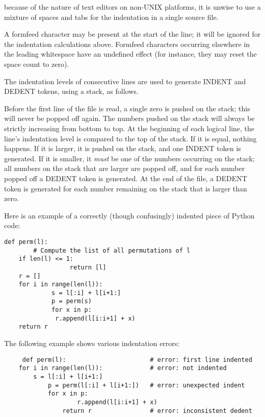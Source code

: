  because of the nature of
text editors on non-UNIX platforms, it is unwise to use a mixture of
spaces and tabs for the indentation in a single source file.

A formfeed character may be present at the start of the line; it will
be ignored for the indentation calculations above.  Formfeed
characters occurring elsewhere in the leading whitespace have an
undefined effect (for instance, they may reset the space count to
zero).

The indentation levels of consecutive lines are used to generate
INDENT and DEDENT tokens, using a stack, as follows.

Before the first line of the file is read, a single zero is pushed on
the stack; this will never be popped off again.  The numbers pushed on
the stack will always be strictly increasing from bottom to top.  At
the beginning of each logical line, the line's indentation level is
compared to the top of the stack.  If it is equal, nothing happens.
If it is larger, it is pushed on the stack, and one INDENT token is
generated.  If it is smaller, it \emph{must} be one of the numbers
occurring on the stack; all numbers on the stack that are larger are
popped off, and for each number popped off a DEDENT token is
generated.  At the end of the file, a DEDENT token is generated for
each number remaining on the stack that is larger than zero.

Here is an example of a correctly (though confusingly) indented piece
of Python code:

\begin{verbatim}
def perm(l):
        # Compute the list of all permutations of l
    if len(l) <= 1:
                  return [l]
    r = []
    for i in range(len(l)):
             s = l[:i] + l[i+1:]
             p = perm(s)
             for x in p:
              r.append(l[i:i+1] + x)
    return r
\end{verbatim}

The following example shows various indentation errors:

\begin{verbatim}
     def perm(l):                       # error: first line indented
    for i in range(len(l)):             # error: not indented
        s = l[:i] + l[i+1:]
            p = perm(l[:i] + l[i+1:])   # error: unexpected indent
            for x in p:
                    r.append(l[i:i+1] + x)
                return r                # error: inconsistent dedent
\end{verbatim}

